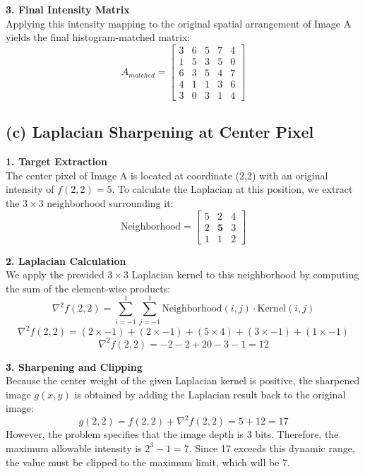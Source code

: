 \documentclass{article}
\begin{document}
\vspace{1em}
\textbf{3. Final Intensity Matrix}\\
Applying this intensity mapping to the original spatial arrangement of Image A yields the final histogram-matched matrix:
\[
A_{matched} = \begin{bmatrix}
3 & 6 & 5 & 7 & 4 \\
1 & 5 & 3 & 5 & 0 \\
6 & 3 & 5 & 4 & 7 \\
4 & 1 & 1 & 3 & 6 \\
3 & 0 & 3 & 1 & 4 
\end{bmatrix}
\]

\subsection*{(c) Laplacian Sharpening at Center Pixel}

\textbf{1. Target Extraction}\\
The center pixel of Image A is located at coordinate (2,2) with an original intensity of $f(2,2) = 5$. 
To calculate the Laplacian at this position, we extract the $3\times3$ neighborhood surrounding it:
\[
\text{Neighborhood} = \begin{bmatrix}
5 & 2 & 4 \\
2 & \mathbf{5} & 3 \\
1 & 1 & 2 
\end{bmatrix}
\]

\vspace{1em}
\textbf{2. Laplacian Calculation}\\
We apply the provided $3\times3$ Laplacian kernel to this neighborhood by computing the sum of the element-wise products:
\[
\nabla^2 f(2,2) = \sum_{i=-1}^{1} \sum_{j=-1}^{1} \text{Neighborhood}(i,j) \cdot \text{Kernel}(i,j)
\]
\[
\nabla^2 f(2,2) = (2 \times -1) + (2 \times -1) + (5 \times 4) + (3 \times -1) + (1 \times -1)
\]
\[
\nabla^2 f(2,2) = -2 - 2 + 20 - 3 - 1 = 12
\]

\vspace{1em}
\textbf{3. Sharpening and Clipping}\\
Because the center weight of the given Laplacian kernel is positive, the sharpened image $g(x,y)$ is obtained by 
adding the Laplacian result back to the original image:
\[
g(2,2) = f(2,2) + \nabla^2 f(2,2) = 5 + 12 = 17
\]
However, the problem specifies that the image depth is 3 bits. Therefore, the maximum allowable intensity 
is $2^3 - 1 = 7$. Since 17 exceeds this dynamic range, the value must be clipped to the maximum limit, which will be 7.
\end{document}
